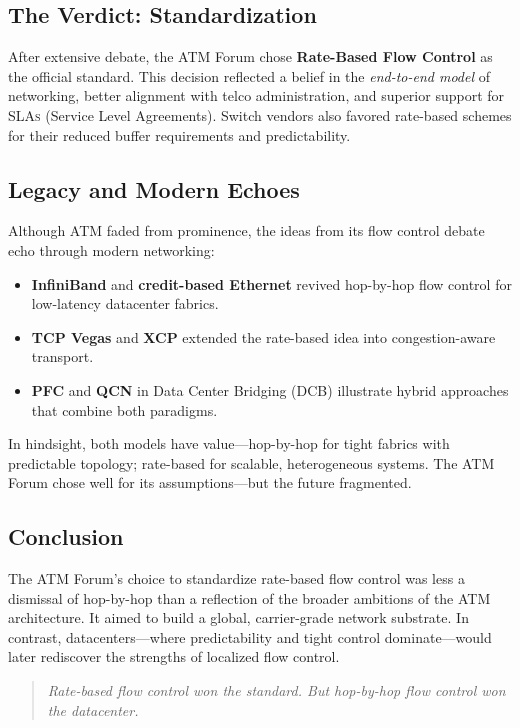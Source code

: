 \subsection{The Verdict: Standardization}

After extensive debate, the ATM Forum chose \textbf{Rate-Based Flow Control} as the official standard. This decision reflected a belief in the \textit{end-to-end model} of networking, better alignment with telco administration, and superior support for \textsc{SLAs} (Service Level Agreements). Switch vendors also favored rate-based schemes for their reduced buffer requirements and predictability.

\subsection{Legacy and Modern Echoes}

Although ATM faded from prominence, the ideas from its flow control debate echo through modern networking:

\begin{itemize}
  \item \textbf{InfiniBand} and \textbf{credit-based Ethernet} revived hop-by-hop flow control for low-latency datacenter fabrics.
  \item \textbf{TCP Vegas} and \textbf{XCP} extended the rate-based idea into congestion-aware transport.
  \item \textbf{PFC} and \textbf{QCN} in Data Center Bridging (DCB) illustrate hybrid approaches that combine both paradigms.
\end{itemize}

In hindsight, both models have value—hop-by-hop for tight fabrics with predictable topology; rate-based for scalable, heterogeneous systems. The ATM Forum chose well for its assumptions—but the future fragmented.

\subsection{Conclusion}

The ATM Forum's choice to standardize rate-based flow control was less a dismissal of hop-by-hop than a reflection of the broader ambitions of the ATM architecture. It aimed to build a global, carrier-grade network substrate. In contrast, datacenters—where predictability and tight control dominate—would later rediscover the strengths of localized flow control.

\begin{quote}
\itshape
Rate-based flow control won the standard. But hop-by-hop flow control won the datacenter.
\end{quote}
